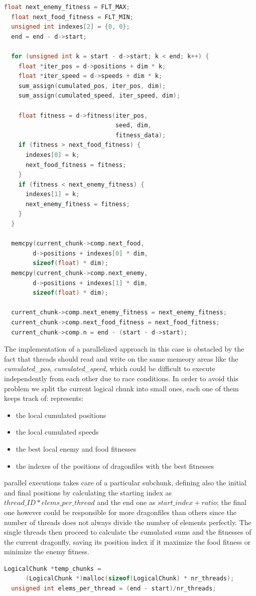 \documentclass[10pt]{article}
\begin{document}
\begin{multicols}{2}
\begin{lstlisting}[language=C,caption={the serial version of \textit{computation\_accumulate}}]
  float next_enemy_fitness = FLT_MAX;
  float next_food_fitness = FLT_MIN;
  unsigned int indexes[2] = {0, 0};
  end = end - d->start;

  for (unsigned int k = start - d->start; k < end; k++) {
    float *iter_pos = d->positions + dim * k;
    float *iter_speed = d->speeds + dim * k;
    sum_assign(cumulated_pos, iter_pos, dim);
    sum_assign(cumulated_speed, iter_speed, dim);

    float fitness = d->fitness(iter_pos, 
                               seed, dim, 
                               fitness_data);
    if (fitness > next_food_fitness) {
      indexes[0] = k;
      next_food_fitness = fitness;
    }
    if (fitness < next_enemy_fitness) {
      indexes[1] = k;
      next_enemy_fitness = fitness;
    }
  }

  memcpy(current_chunk->comp.next_food, 
        d->positions + indexes[0] * dim,
        sizeof(float) * dim);
  memcpy(current_chunk->comp.next_enemy, 
        d->positions + indexes[1] * dim,
        sizeof(float) * dim);
      
  current_chunk->comp.next_enemy_fitness = next_enemy_fitness;
  current_chunk->comp.next_food_fitness = next_food_fitness;
  current_chunk->comp.n = end - (start - d->start);
\end{lstlisting}


The implementation of a parallelized approach in this case is obstacled by the fact that 
threads should read and write on the same memeory areas like the \textit{cumulated\_pos},
\textit{cumulated\_speed}, which could be 
difficult to execute independently from each other due to race conditions. 
In order to avoid this problem we split the current logical chunk into small ones, each
one of them keeps track of: 
represents:
\begin{itemize}
\item the local cumulated positions
\item the local cumulated speeds
\item the best local enemy and food fitnesses
\item the indexes of the positions of dragonfiles with the best fitnesses
\end{itemize}
\noindent parallel executions takes care of a particular subchunk,
defining also the initial and final positions by
calculating the starting index as $thread\_ID*elems\_per\_thread$ and the end one as $start\_index+ratio$; 
the final one however could be responsible for more dragonfiles 
than others since the number of threads does not always
divide the number of elements perfectly. The single threads then proceed to 
calculate the cumulated sums and the fitnesses of the current dragonfly, 
saving its position index if it maximize the food fitness or minimize the 
enemy fitness. 
\begin{lstlisting}[language=C,caption={the parallel version of \textit{computation\_accumulate}}]
  LogicalChunk *temp_chunks =
      (LogicalChunk *)malloc(sizeof(LogicalChunk) * nr_threads);
  unsigned int elems_per_thread = (end - start)/nr_threads;


\end{lstlisting}
\end{multicols}
\end{document}
